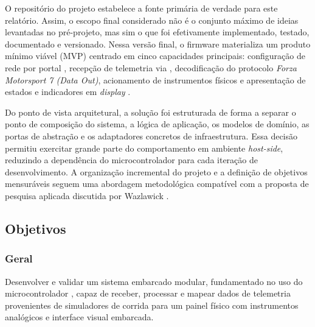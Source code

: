 \documentclass[12pt,oneside,a4paper]{article}
\renewcommand{\texttt}[1]{\begingroup\ttfamily\seqsplit{#1}\endgroup}
\begin{document}
O repositório do projeto estabelece a fonte primária de verdade para este
relatório. Assim, o escopo final considerado não é o conjunto máximo de ideias
levantadas no pré-projeto, mas sim o que foi efetivamente implementado,
testado, documentado e versionado. Nessa versão final, o firmware materializa
um produto mínimo viável (MVP) centrado em cinco capacidades principais: configuração de rede por
portal \texttt{Wi-Fi}, recepção de telemetria via \texttt{UDP}, decodificação
do protocolo \textit{Forza Motorsport 7 (Data Out)}, acionamento de
instrumentos físicos e apresentação de estados e indicadores em \textit{display}
\texttt{TFT}.

Do ponto de vista arquitetural, a solução foi estruturada de forma a separar o
ponto de composição do sistema, a lógica de aplicação, os modelos de domínio,
as portas de abstração e os adaptadores concretos de infraestrutura. Essa
decisão permitiu exercitar grande parte do comportamento em ambiente \textit{host-side},
reduzindo a dependência do microcontrolador para cada iteração de
desenvolvimento. A organização incremental do projeto e a definição de
objetivos mensuráveis seguem uma abordagem metodológica compatível com a
proposta de pesquisa aplicada discutida por Wazlawick
\cite{wazlawick2017metodologia}.

\subsection{Objetivos}

\subsubsection{Geral}
Desenvolver e validar um sistema embarcado modular, fundamentado no uso do
microcontrolador \texttt{ESP32}, capaz de receber, processar e mapear dados de
telemetria provenientes de simuladores de corrida para um painel físico com
instrumentos analógicos e interface visual embarcada.
\end{document}
